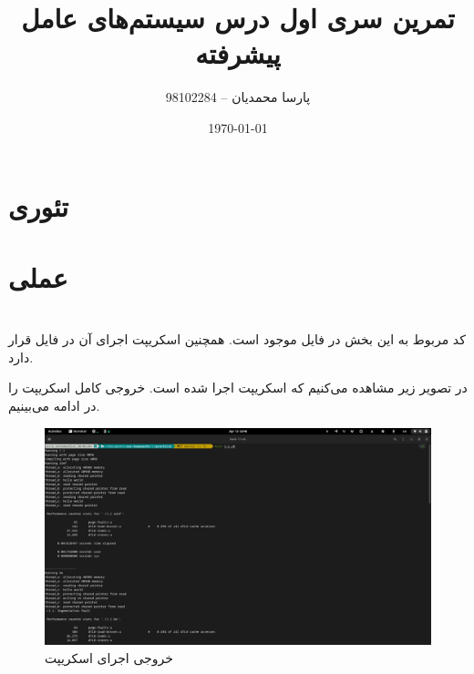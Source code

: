 \documentclass{article}
\title{تمرین سری اول درس سیستم‌های عامل پیشرفته}
\author{پارسا محمدیان -- 98102284}
\date{\today}
\begin{document}
\maketitle

\section*{تئوری}
\section{}

\section*{عملی}
\setcounter{section}{0}
\section{}
\subsection{}
\subsubsection{}
کد مربوط به این بخش در فایل 
موجود است. همچنین اسکریپت اجرای آن در فایل
قرار دارد.

در تصویر زیر مشاهده می‌کنیم که اسکریپت اجرا شده است.
خروجی کامل اسکریپت را در ادامه می‌بینیم.

\begin{figure}[H]
\centering
\includegraphics[width=\textwidth]{1.1.png}
\caption{خروجی اجرای اسکریپت}
\label{fig:1.1}
\end{figure}
\end{document}
